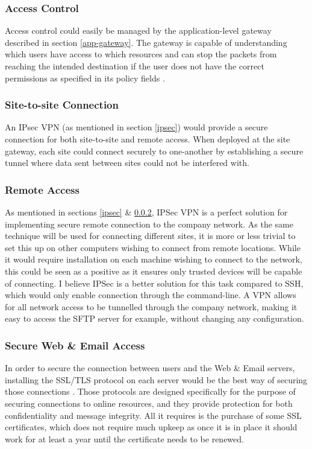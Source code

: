 \documentclass[11pt]{article}
\begin{document}
        \subsubsection{Access Control}
          Access control could easily be managed by the application-level gateway described in section \ref{app-gateway}. The gateway is capable of understanding which users have access to which resources and can stop the packets from reaching the intended destination if the user does not have the correct permissions as specified in its policy fields \citep{openAppGateway}.

        \subsubsection{Site-to-site Connection} \label{ipsec2}
          An IPsec VPN (as mentioned in section \ref{ipsec}) would provide a secure connection for both site-to-site and remote access. When deployed at the site gateway, each site could connect securely to one-another by establishing a secure tunnel where data sent between sites could not be interfered with.

        \subsubsection{Remote Access}
          As mentioned in sections \ref{ipsec} \& \ref{ipsec2}, IPSec VPN is a perfect solution for implementing secure remote connection to the company network. As the same technique will be used for connecting different sites, it is more or less trivial to set this up on other computers wishing to connect from remote locations. While it would require installation on each machine wishing to connect to the network, this could be seen as a positive as it ensures only trusted devices will be capable of connecting. I believe IPSec is a better solution for this task compared to SSH, which would only enable connection through the command-line. A VPN allows for all network access to be tunnelled through the company network, making it easy to access the SFTP server for example, without changing any configuration.

        \subsubsection{Secure Web \& Email Access}
          In order to secure the connection between users and the Web \& Email servers, installing the SSL/TLS protocol on each server would be the best way of securing those connections \citep{ncsc2017tls}. Those protocols are designed specifically for the purpose of securing connections to online resources, and they provide protection for both confidentiality and message integrity. All it requires is the purchase of some SSL certificates, which does not require much upkeep as once it is in place it should work for at least a year until the certificate needs to be renewed.
\end{document}
